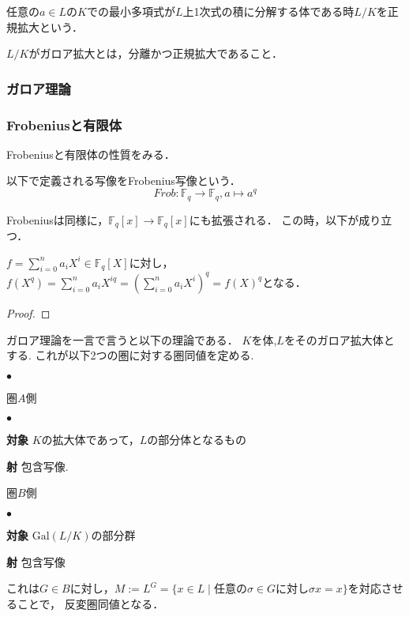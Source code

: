 \documentclass{ujarticle}
\renewenvironment{itemize}%
{%
   \begin{list}{\parbox{1zw}{$\bullet$}}%
   {%
      \setlength{\topsep}{0zh}
      \setlength{\itemindent}{0zw}
      \setlength{\leftmargin}{2zw}%
      \setlength{\rightmargin}{0zw}%
      \setlength{\labelsep}{1zw}%
      \setlength{\labelwidth}{3zw}%
      \setlength{\itemsep}{0em}%
      \setlength{\parsep}{0em}%
      \setlength{\listparindent}{0zw}%
   }
}{%
   \end{list}%
}
\begin{document}
\begin{dfn}
 任意の$a \in L$の$K$での最小多項式が$L$上1次式の積に分解する体である時$L/K$を正規拡大という．
\end{dfn}

\begin{dfn}
 $L/K$がガロア拡大とは，分離かつ正規拡大であること．
\end{dfn}
\subsubsection{ガロア理論}
\label{sub:ガロア理論}

\subsubsection{Frobeniusと有限体}
\label{sub:Frobeniusと有限体}
Frobeniusと有限体の性質をみる．
\begin{dfn}
  以下で定義される写像をFrobenius写像という．
  \begin{equation*}
    Frob:\mathbb{F}_q　\to \mathbb{F}_q　,a \mapsto a^q
  \end{equation*}
\end{dfn}
Frobeniusは同様に，$\mathbb{F}_q[x] \to \mathbb{F}_q[x]$にも拡張される．
この時，以下が成り立つ．
\begin{prop}
 $f = \sum_{i=0}^n a_iX^i \in \mathbb{F}_q[X]$に対し，
 $f(X^q)=\sum_{i=0}^n a_iX^{iq} = (\sum_{i=0}^n a_iX^{i})^q=f(X)^q$となる．
\end{prop}
\begin{proof}
\end{proof}




ガロア理論を一言で言うと以下の理論である．
$K$を体,$L$をそのガロア拡大体とする.
これが以下2つの圏に対する圏同値を定める.
\begin{itemize}
  \item  圏$A$側
  \begin{itemize}
    \item  \textbf{対象} $K$の拡大体であって，$L$の部分体となるもの
    \item  \textbf{射} 包含写像.
  \end{itemize}
  \item  圏$B$側
  \begin{itemize}
    \item  \textbf{対象} $\mathrm{Gal}(L/K)$の部分群
    \item  \textbf{射} 包含写像
  \end{itemize}
\end{itemize}
これは$G \in B$に対し，$M := L^G=\{ x \in L \mid \text{任意の}\sigma \in G \text{に対し} \sigma x = x\}$を対応させることで，
反変圏同値となる．
\end{document}
